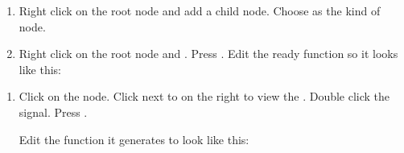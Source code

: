 \documentclass[a4paper,12pt,english]{sphinxmanual}
\begin{document}
\sphinxAtStartPar
{} 
\begin{enumerate}
%
\setcounter{enumi}{6}
\item {} 
\sphinxAtStartPar
Right click on the root node and add a child node. Choose
 as the kind of node.

\item {} 
\sphinxAtStartPar
Right click on the root node and . Press .
Edit the ready function so it looks like this:

\end{enumerate}

\begin{sphinxVerbatim}[commandchars=\\\{\}]
 
\end{sphinxVerbatim}
\begin{enumerate}
%
\setcounter{enumi}{8}
\item {} 
\sphinxAtStartPar
Click on the  node. Click  next to 
on the right to view the . Double click the
 signal. Press .

\sphinxAtStartPar
Edit the function it generates to look like this:

\end{enumerate}
\end{document}
